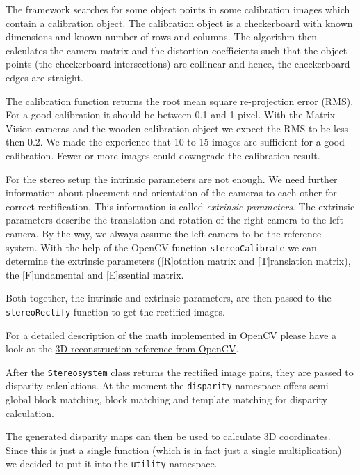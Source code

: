 \documentclass[11pt]{article}
\begin{document}
The framework searches for some object points  in some calibration images which contain a calibration object. The calibration object is a checkerboard with known dimensions and known number of rows and columns. The algorithm then calculates the camera matrix and the distortion coefficients such that the object points (the checkerboard intersections)  are collinear and hence, the checkerboard edges are straight.%

The calibration function returns the root mean square re-projection error (RMS). For a good calibration it should be between 0.1 and 1 pixel. With the Matrix Vision cameras and the wooden calibration object we expect the RMS to be less then 0.2. We made the experience that 10 to 15 images are sufficient for a good calibration. Fewer or more images could downgrade the calibration result. 


For the stereo setup the intrinsic parameters are not enough. We need further information about placement and orientation of the cameras to each other for correct rectification. This information is called \emph{extrinsic parameters}. The extrinsic parameters describe the translation and rotation of the right camera to the left camera. By the way, we always assume the left camera to be the reference system. With the help of the OpenCV function \texttt{stereoCalibrate} we can determine the extrinsic parameters ([R]otation matrix and [T]ranslation matrix), the [F]undamental and [E]ssential matrix.

Both together, the intrinsic and extrinsic parameters, are then passed to the \texttt{stereoRectify} function to get the rectified images.%

\bigskip
For a detailed description of the math implemented in OpenCV please have a look at the \href{http://docs.opencv.org/modules/calib3d/doc/camera_calibration_and_3d_reconstruction.html}{3D reconstruction reference from OpenCV}.
\bigskip

After the \texttt{Stereosystem} class returns the rectified image pairs, they are passed to disparity calculations. At the moment the \texttt{disparity} namespace offers semi-global block matching, block matching and template matching for disparity calculation.

The generated disparity maps can then be used to calculate 3D coordinates. Since this is just a single function (which is in fact just a single multiplication) we decided to put it into the \texttt{utility} namespace.
\end{document}
